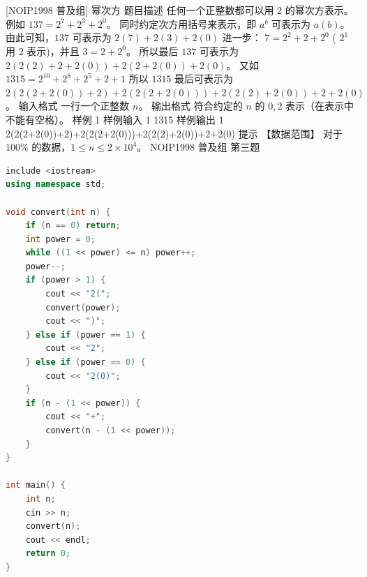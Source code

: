 \documentclass[12pt,twiside,a4paper]{ctexbook}
\numberwithin{chapter}{part}
\begin{document}
\section{}
 [NOIP1998 普及组] 幂次方
 题目描述
任何一个正整数都可以用 $2$ 的幂次方表示。例如 $137=2^7+2^3+2^0 $。
同时约定次方用括号来表示，即 $a^b$ 可表示为 $a(b)$。
由此可知，$137$ 可表示为 $2(7)+2(3)+2(0)$
进一步：
$7= 2^2+2+2^0$  ( $2^1$ 用 $2$ 表示)，并且 $3=2+2^0$。
所以最后 $137$ 可表示为 $2(2(2)+2+2(0))+2(2+2(0))+2(0)$。
又如 $1315=2^{10} +2^8 +2^5 +2+1$
所以 $1315$ 最后可表示为 $2(2(2+2(0))+2)+2(2(2+2(0)))+2(2(2)+2(0))+2+2(0)$。
 输入格式
一行一个正整数 $n$。
 输出格式
符合约定的 $n$ 的 $0, 2$ 表示（在表示中不能有空格）。
 样例 1
 样例输入 1
1315
 样例输出 1
2(2(2+2(0))+2)+2(2(2+2(0)))+2(2(2)+2(0))+2+2(0)
 提示
【数据范围】
对于 $100\%$ 的数据，$1 \le n \le 2 \times {10}^4$。
NOIP1998 普及组 第三题
\begin{lstlisting}[language=c++,breaklines=true]
include <iostream>
using namespace std;

void convert(int n) {
    if (n == 0) return;
    int power = 0;
    while ((1 << power) <= n) power++;
    power--;
    if (power > 1) {
        cout << "2(";
        convert(power);
        cout << ")";
    } else if (power == 1) {
        cout << "2";
    } else if (power == 0) {
        cout << "2(0)";
    }
    if (n - (1 << power)) {
        cout << "+";
        convert(n - (1 << power));
    }
}

int main() {
    int n;
    cin >> n;
    convert(n);
    cout << endl;
    return 0;
}
\end{lstlisting}

\section{}
\begin{lstlisting}[language=c++,breaklines=true]

\end{lstlisting}
\end{document}
